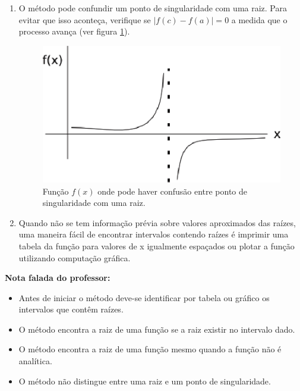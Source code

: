 \begin{enumerate}
\item O método pode confundir um ponto de singularidade com uma raiz. Para evitar que isso aconteça, verifique se $|f(c) - f(a)| = 0 $ a medida que o processo avança (ver figura \ref{fig:bissecao4}).

\begin{figure}[htb]
  \setlength{\abovecaptionskip}{20pt}
  \centering
  \includegraphics[scale=0.8]{capitulos/capitulo1/figuras/bissecao4.eps}
  \caption{Função $f(x)$ onde pode haver confusão entre ponto de singularidade com uma raiz.}
  \label{fig:bissecao4}
\end{figure}

\item Quando não se tem informação prévia sobre valores aproximados das raízes, uma maneira fácil de encontrar intervalos contendo raízes é imprimir uma tabela da função para valores de x igualmente espaçados ou plotar a função utilizando computação gráfica.

\end{enumerate}

\textbf{Nota falada do professor:}

\begin{itemize}
 \item Antes de iniciar o método deve-se identificar por tabela ou gráfico os intervalos que contêm raízes.

 \item O método encontra a raiz de uma função se a raiz existir no intervalo dado.

 \item O método encontra a raiz de uma função mesmo quando a função não é analítica.

 \item O método não distingue entre uma raiz e um ponto de singularidade.
\end{itemize}